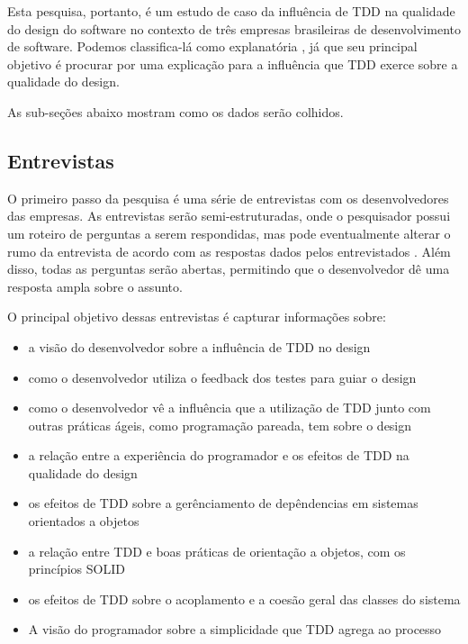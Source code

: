 Esta pesquisa, portanto, é um estudo de caso da influência de TDD na qualidade do design do software no 
contexto de três empresas brasileiras de desenvolvimento de software. 
Podemos classifica-lá como explanatória \cite{robson}, já que seu principal objetivo é
procurar por uma explicação para a influência que TDD exerce sobre a qualidade do design.

As sub-seções abaixo mostram como os dados serão colhidos.

\subsection{Entrevistas}
\label{sec:planejamento-estrategia-entrevistas}

O primeiro passo da pesquisa é uma série de entrevistas com os desenvolvedores das empresas. 
As entrevistas serão semi-estruturadas, onde o pesquisador possui um roteiro de perguntas a serem respondidas, mas pode eventualmente
alterar o rumo da entrevista de acordo com as respostas dados pelos entrevistados \cite{guidelines-case-study}. 
Além disso, todas as perguntas serão abertas, permitindo que o desenvolvedor dê uma resposta ampla sobre o assunto.

O principal objetivo dessas entrevistas é capturar informações sobre:

\begin{itemize}
	\item a visão do desenvolvedor sobre a influência de TDD no design
	\item como o desenvolvedor utiliza o feedback dos testes para guiar o design
	\item como o desenvolvedor vê a influência que a utilização de TDD junto com outras práticas ágeis, como programação pareada, tem sobre o design
	\item a relação entre a experiência do programador e os efeitos de TDD na qualidade do design
	\item os efeitos de TDD sobre a gerênciamento de depêndencias em sistemas orientados a objetos
	\item a relação entre TDD e boas práticas de orientação a objetos, com os princípios SOLID \cite{bob-martin}
	\item os efeitos de TDD sobre o acoplamento e a coesão geral das classes do sistema
	\item A visão do programador sobre a simplicidade que TDD agrega ao processo
\end{itemize} 

